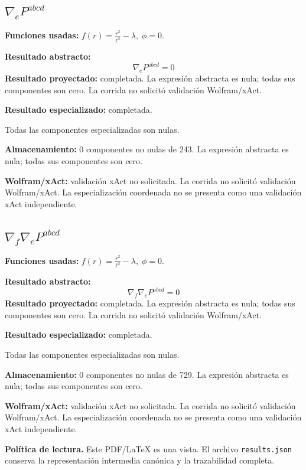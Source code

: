 \documentclass[11pt]{article}
\begin{document}
\subsection*{$ \nabla_e P^{abcd} $}
\textbf{Funciones usadas:} $ f\!\left(r\right) = \frac{{r}^{2}}{{\ell}^{2}} - \lambda,\;\phi=0 $.\par
\textbf{Resultado abstracto:}
\begin{dmath*}[breakdepth={5}]
\nabla_e P^{abcd} = 0
\end{dmath*}
\textbf{Resultado proyectado:} completada. La expresión abstracta es nula; todas sus componentes son cero. La corrida no solicitó validación Wolfram/xAct.\par
\textbf{Resultado especializado:} completada.\par
Todas las componentes especializadas son nulas.\par
\textbf{Almacenamiento:} 0 componentes no nulas de 243. La expresión abstracta es nula; todas sus componentes son cero.\par
\textbf{Wolfram/xAct:} validación xAct no solicitada. La corrida no solicitó validación Wolfram/xAct. La especialización coordenada no se presenta como una validación xAct independiente.\par\medskip
{}
\subsection*{$ \nabla_f\nabla_e P^{abcd} $}
\textbf{Funciones usadas:} $ f\!\left(r\right) = \frac{{r}^{2}}{{\ell}^{2}} - \lambda,\;\phi=0 $.\par
\textbf{Resultado abstracto:}
\begin{dmath*}[breakdepth={5}]
\nabla_f\nabla_e P^{abcd} = 0
\end{dmath*}
\textbf{Resultado proyectado:} completada. La expresión abstracta es nula; todas sus componentes son cero. La corrida no solicitó validación Wolfram/xAct.\par
\textbf{Resultado especializado:} completada.\par
Todas las componentes especializadas son nulas.\par
\textbf{Almacenamiento:} 0 componentes no nulas de 729. La expresión abstracta es nula; todas sus componentes son cero.\par
\textbf{Wolfram/xAct:} validación xAct no solicitada. La corrida no solicitó validación Wolfram/xAct. La especialización coordenada no se presenta como una validación xAct independiente.\par\medskip
\bigskip\noindent\textbf{Política de lectura.} Este PDF/LaTeX es una vista. El archivo \texttt{results.json} conserva la representación intermedia canónica y la trazabilidad completa.
\end{document}
